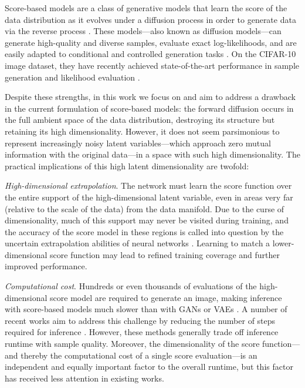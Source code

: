 \documentclass{article}
\begin{document}
Score-based models are a class of generative models that learn the score of the data distribution as it evolves under a diffusion process in order to generate data via the reverse process \cite{song2021score,ho2020denoising}. These models---also known as diffusion models---can generate high-quality and diverse samples, evaluate exact log-likelihoods, and are easily adapted to conditional and controlled generation tasks \cite{song2021score}. On the CIFAR-10 image dataset, they have recently achieved state-of-the-art performance in sample generation and likelihood evaluation  \cite{vahdat2021score,kingma2021variational}.

Despite these strengths, in this work we focus on and aim to address a drawback in the current formulation of score-based models: the forward diffusion occurs in the full ambient space of the data distribution, destroying its structure but retaining its high dimensionality. However, it does not seem parsimonious to represent increasingly noisy latent variables---which approach zero mutual information with the original data---in a space with such high dimensionality. The practical implications of this high latent dimensionality are twofold: 

\emph{High-dimensional extrapolation}. The network must learn the score function over the entire support of the high-dimensional latent variable, even in areas very far (relative to the scale of the data) from the data manifold. Due to the curse of dimensionality, much of this support may never be visited during training, and the accuracy of the score model in these regions is called into question by the uncertain extrapolation abilities of neural networks \cite{xu2020neural}. Learning to match a lower-dimensional score function may lead to refined training coverage and further improved performance.

\emph{Computational cost}. Hundreds or even thousands of evaluations of the high-dimensional score model are required to generate an image, making inference with score-based models much slower than with GANs or VAEs \cite{ho2020denoising,song2021score}. A number of recent works aim to address this challenge by reducing the number of steps required for inference \cite{song2020denoising,salimans2021progressive,jolicoeur2021gotta,nichol2021improved,dhariwal2021diffusion,kong2021fast,watson2021learning,san2021noise,lam2021bilateral,bao2022analytic}. However, these methods generally trade off inference runtime with sample quality. Moreover, the dimensionality of the score function---and thereby the computational cost of a single score evaluation---is an independent and equally important factor to the overall runtime, but this factor has received less attention in existing works.
\end{document}
